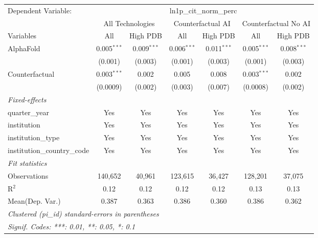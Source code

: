 \begingroup
\centering
\begin{tabular}{lcccccc}
   \tabularnewline \midrule \midrule
   Dependent Variable: & \multicolumn{6}{c}{ln1p\_cit\_norm\_perc}\\
 & \multicolumn{2}{c}{All Technologies} & \multicolumn{2}{c}{Counterfactual AI} & \multicolumn{2}{c}{Counterfactual No AI} \\
\cmidrule(lr){1-1}\cmidrule(lr){2-3} \cmidrule(lr){4-5} \cmidrule(lr){6-7}
Variables & \multicolumn{1}{c}{All} & \multicolumn{1}{c}{High PDB} & \multicolumn{1}{c}{All} & \multicolumn{1}{c}{High PDB} & \multicolumn{1}{c}{All} & \multicolumn{1}{c}{High PDB} \\
\cmidrule(lr){1-1}\cmidrule(lr){2-2} \cmidrule(lr){3-3} \cmidrule(lr){4-4} \cmidrule(lr){5-5} \cmidrule(lr){6-6} \cmidrule(lr){7-7}
   AlphaFold                    & 0.005$^{***}$ & 0.009$^{***}$ & 0.006$^{***}$ & 0.011$^{***}$ & 0.005$^{***}$ & 0.008$^{***}$\\   
                                & (0.001)       & (0.003)       & (0.001)       & (0.003)       & (0.001)       & (0.003)\\   
   Counterfactual               & 0.003$^{***}$ & 0.002         & 0.005         & 0.008         & 0.003$^{***}$ & 0.002\\   
                                & (0.0009)      & (0.002)       & (0.003)       & (0.007)       & (0.0008)      & (0.002)\\   
   \midrule
   \emph{Fixed-effects}\\
   quarter\_year                & Yes           & Yes           & Yes           & Yes           & Yes           & Yes\\  
   institution                  & Yes           & Yes           & Yes           & Yes           & Yes           & Yes\\  
   institution\_type            & Yes           & Yes           & Yes           & Yes           & Yes           & Yes\\  
   institution\_country\_code   & Yes           & Yes           & Yes           & Yes           & Yes           & Yes\\  
   \midrule
   \emph{Fit statistics}\\
   Observations                 & 140,652       & 40,961        & 123,615       & 36,427        & 128,201       & 37,075\\  
   R$^2$                        & 0.12          & 0.12          & 0.12          & 0.12          & 0.13          & 0.13\\  
Mean(Dep. Var.) & 0.387 & 0.363 & 0.386 & 0.360 & 0.386 & 0.362 \\
   \midrule \midrule
   \multicolumn{7}{l}{\emph{Clustered (pi\_id) standard-errors in parentheses}}\\
   \multicolumn{7}{l}{\emph{Signif. Codes: ***: 0.01, **: 0.05, *: 0.1}}\\
\end{tabular}
\par\endgroup
